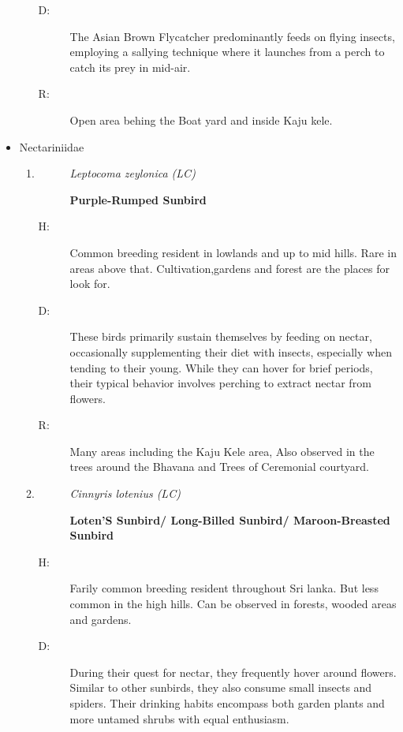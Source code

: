 \begin{itemize}
\begin{enumerate}
\begin{description}
\item[D: ]%
The Asian Brown Flycatcher predominantly feeds on flying insects, employing a sallying technique where it launches from a perch to catch its prey in mid{-}air.%
\item[R: ]%
Open area behing the Boat yard and inside Kaju kele.%
\end{description}%
\end{enumerate}%
\item%
Nectariniidae%
\begin{enumerate}%
\item%
\begin{description}%
\item[]%
\textit{Leptocoma zeylonica (LC)}%
\item[]%
\textbf{Purple{-}Rumped Sunbird}%
\end{description}%
\begin{description}%
\item[H: ]%
Common breeding resident in lowlands and up to mid hills. Rare in areas above that. Cultivation,gardens and forest are the places for look for. %
\item[D: ]%
These birds primarily sustain themselves by feeding on nectar, occasionally supplementing their diet with insects, especially when tending to their young. While they can hover for brief periods, their typical behavior involves perching to extract nectar from flowers.%
\item[R: ]%
Many areas including the Kaju Kele area, Also observed in the trees around the Bhavana and Trees of Ceremonial courtyard. %
\end{description}%
\item%
\begin{description}%
\item[]%
\textit{Cinnyris lotenius (LC)}%
\item[]%
\textbf{Loten'S Sunbird/ Long{-}Billed Sunbird/ Maroon{-}Breasted Sunbird}%
\end{description}%
\begin{description}%
\item[H: ]%
Farily common breeding resident throughout Sri lanka. But less common in the high hills. Can be observed in forests, wooded areas and gardens.%
\item[D: ]%
During their quest for nectar, they frequently hover around flowers. Similar to other sunbirds, they also consume small insects and spiders. Their drinking habits encompass both garden plants and more untamed shrubs with equal enthusiasm.%

\end{description}
\end{enumerate}
\end{itemize}
